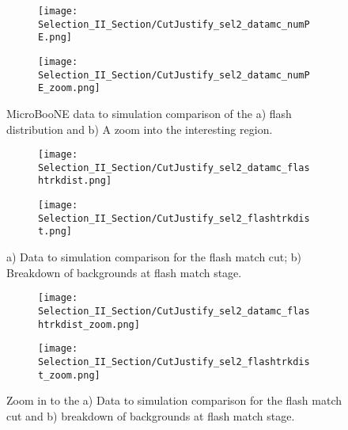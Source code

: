 \documentclass{article}
\begin{document}
\begin{figure}[t!]
  \centering
  \begin{subfigure}[t]{0.4\textwidth}
    \centering
    \texttt{[image: Selection\_II\_Section/CutJustify\_sel2\_datamc\_numPE.png]}
    \caption{ }
  \end{subfigure} 
  \hspace{10 mm}
  \begin{subfigure}[t]{0.4\textwidth}
    \centering
    \texttt{[image: Selection\_II\_Section/CutJustify\_sel2\_datamc\_numPE\_zoom.png]}
    \caption{ }
  \end{subfigure}

\caption{ MicroBooNE data to simulation comparison of the a) flash distribution and b) A zoom into the interesting region. }
\label{fig:cutjust_sel2_numPE_datamc}
\end{figure}


\begin{figure}[h!]
\centering
  \begin{subfigure}[t]{0.4\textwidth}
    \centering
\texttt{[image: Selection\_II\_Section/CutJustify\_sel2\_datamc\_flashtrkdist.png]}
    \caption{ }
  \end{subfigure} 
  \hspace{10 mm}
  \begin{subfigure}[t]{0.4\textwidth}
    \centering
\texttt{[image: Selection\_II\_Section/CutJustify\_sel2\_flashtrkdist.png]}
    \caption{ }
  \end{subfigure} 
\caption{ a) Data to simulation comparison for the flash match cut; b) Breakdown of backgrounds at flash match stage. }
\label{fig:cutjust_sel2_flashtrkdist}
\end{figure}

\begin{figure}[h!]
\centering
  \begin{subfigure}[t]{0.4\textwidth}
    \centering
\texttt{[image: Selection\_II\_Section/CutJustify\_sel2\_datamc\_flashtrkdist\_zoom.png]}
    \caption{ }
  \end{subfigure} 
  \hspace{10 mm}
  \begin{subfigure}[t]{0.4\textwidth}
    \centering
\texttt{[image: Selection\_II\_Section/CutJustify\_sel2\_flashtrkdist\_zoom.png]}
   \caption{ }
  \end{subfigure} 
\caption{ Zoom in to the a) Data to simulation comparison for the flash match cut and b) breakdown of backgrounds at flash match stage. }
\label{fig:cutjust_sel2_flashtrkdist_zoom}
\end{figure}
\end{document}
